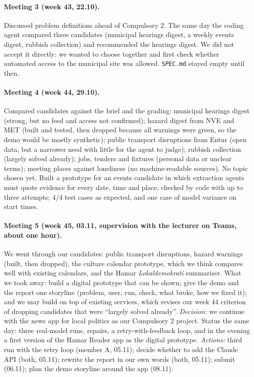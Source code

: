 \documentclass{article}
\begin{document}
\paragraph{Meeting 3 (week 43, 22.10).} Discussed problem definitions ahead of Compulsory 2. The
same day the coding agent compared three candidates (municipal hearings digest, a weekly events
digest, rubbish collection) and recommended the hearings digest. We did not accept it directly:
we wanted to choose together and first check whether automated access to the municipal site was
allowed. \texttt{SPEC.md} stayed empty until then.

\paragraph{Meeting 4 (week 44, 29.10).} Compared candidates against the brief and the grading:
municipal hearings digest (strong, but no feed and access not confirmed); hazard digest from NVE
and MET (built and tested, then dropped because all warnings were green, so the demo would be
mostly synthetic); public transport disruptions from Entur (open data, but a narrower need with
little for the agent to judge); rubbish collection (largely solved already); jobs, tenders and
fixtures (personal data or unclear terms); meeting places against loneliness (no machine-readable
sources). No topic chosen yet. Built a prototype for an events candidate in which extraction
agents must quote evidence for every date, time and place, checked by code with up to three
attempts; 4/4 test cases as expected, and one case of model variance on start times.

\paragraph{Meeting 5 (week 45, 03.11, supervision with the lecturer on Teams, about one hour).}
We went through our candidates: public transport disruptions, hazard warnings (built, then
dropped), the culture calendar prototype, which we think compares well with existing calendars,
and the Hamar \emph{Lokaldemokrati} summariser. What we took away: build a digital prototype
that can be shown; give the demo and the report one storyline (problem, user, run, check, what
broke, how we fixed it); and we may build on top of existing services, which revises our week 44
criterion of dropping candidates that were ``largely solved already''. \emph{Decision:} we
continue with the news app for local politics as our Compulsory 2 project. Status the same day:
three real-model runs, repairs, a retry-with-feedback loop, and in the evening a first
version of the Hamar Reader app as the digital prototype.
\emph{Actions:} third run with the retry loop (member A, 05.11); decide whether to add the Claude API
(both, 05.11); rewrite the report in our own words (both, 05.11); submit (06.11); plan the demo
storyline around the app (08.11).
\end{document}
